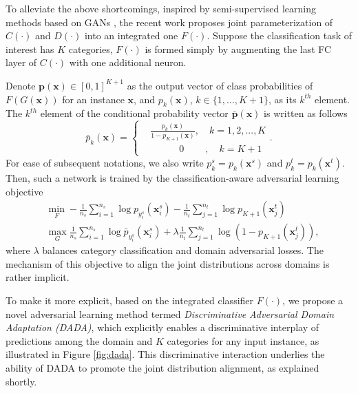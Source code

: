 \documentclass[letterpaper]{article} \usepackage{aaai20}  \usepackage{times}  \usepackage{helvet} \usepackage{courier}  \usepackage[hyphens]{url}  \usepackage{graphicx} \urlstyle{rm} \def\UrlFont{\rm}  \usepackage{graphicx}  \frenchspacing  \setlength{\pdfpagewidth}{8.5in}  \setlength{\pdfpageheight}{11in}
\begin{document}
To alleviate the above shortcomings, inspired by semi-supervised learning methods based on GANs \cite{gan_tech1,gan_tech2}, the recent work \cite{dann_ca} proposes joint parameterization of $C(\cdot)$ and $D(\cdot)$ into an integrated one $F(\cdot)$. Suppose the classification task of interest has $K$ categories, $F(\cdot)$ is formed simply by augmenting the last FC layer of $C(\cdot)$ with one additional neuron. 

Denote $\mathbf{p}(\mathbf{x}) \in [0, 1]^{K + 1}$ as the output vector of class probabilities of $F(G(\mathbf{x}))$ for an instance $\mathbf{x}$, and $p_k(\mathbf{x})$, $k \in \{1, \dots, K+1\}$, as its $k^{th}$ element. The $k^{th}$ element of the conditional probability vector $\bar{\mathbf{p}}(\mathbf{x})$ is written as follows 
\begin{equation}
\bar{p}_k(\mathbf{x}) = \left\{  
\begin{aligned}
&\frac{p_k(\mathbf{x})}{1-p_{K+1}(\mathbf{x})}, \quad k=1, 2, ..., K  \\
&\qquad\quad 0 \:\qquad, \quad k= K+1
\end{aligned}  
\right. .
\end{equation}
For ease of subsequent notations, we also write $p_k^s = p_k(\mathbf{x}^s)$ and $p_k^t = p_k(\mathbf{x}^t)$. Then, such a network is trained by the classification-aware adversarial learning objective 
\begin{align}
& \min_{F} - \frac{1}{n_s} \sum_{i=1}^{n_s} \log p_{y_i^s}(\mathbf{x}_i^s) - \frac{1}{n_t} \sum_{j=1}^{n_t} \log p_{K+1}(\mathbf{x}_j^t) \label{EqnDANN_CA} \\
& \max_{G} \frac{1}{n_s} \sum_{i=1}^{n_s} \log \bar{p}_{y_i^s}(\mathbf{x}_i^s) + \lambda \frac{1}{n_t} \sum_{j=1}^{n_t} \log (1 - p_{K+1}(\mathbf{x}_j^t)) , \nonumber
\end{align}
where $\lambda$ balances category classification and domain adversarial losses. The mechanism of this objective to align the joint distributions across domains is rather implicit. 

To make it more explicit, based on the integrated classifier $F(\cdot)$, we propose a novel adversarial learning method termed \emph{Discriminative Adversarial Domain Adaptation (DADA)}, which explicitly enables a discriminative interplay of predictions among the domain and $K$ categories for any input instance, as illustrated in Figure \ref{fig:dada}. This discriminative interaction underlies the ability of DADA to promote the joint distribution alignment, as explained shortly.
\end{document}
